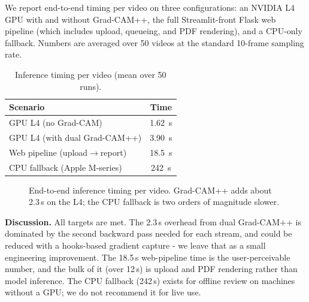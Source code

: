 We report end-to-end timing per video on three configurations: an NVIDIA L4 GPU with and without Grad-CAM++, the full Streamlit-front Flask web pipeline (which includes upload, queueing, and PDF rendering), and a CPU-only fallback. Numbers are averaged over 50 videos at the standard 10-frame sampling rate.

\begin{table}[!t]
\centering
\caption{Inference timing per video (mean over 50 runs).}
\label{tab:timing}
\begin{tabular}{@{}lc@{}}
\toprule
\textbf{Scenario} & \textbf{Time} \\
\midrule
GPU L4 (no Grad-CAM)            & 1.62~s \\
GPU L4 (with dual Grad-CAM++)   & 3.90~s \\
Web pipeline (upload$\to$report)& 18.5~s \\
CPU fallback (Apple M-series)   & 242~s  \\
\bottomrule
\end{tabular}
\end{table}

\begin{figure}[!t]
\centering
{}
\caption{End-to-end inference timing per video. Grad-CAM++ adds about 2.3\,s on the L4; the CPU fallback is two orders of magnitude slower.}
\label{fig:timing_chart}
\end{figure}

\textbf{Discussion.}  All targets are met. The 2.3\,s overhead from dual Grad-CAM++ is dominated by the second backward pass needed for each stream, and could be reduced with a hooks-based gradient capture - we leave that as a small engineering improvement. The 18.5\,s web-pipeline time is the user-perceivable number, and the bulk of it (over 12\,s) is upload and PDF rendering rather than model inference. The CPU fallback (242\,s) exists for offline review on machines without a GPU; we do not recommend it for live use.

